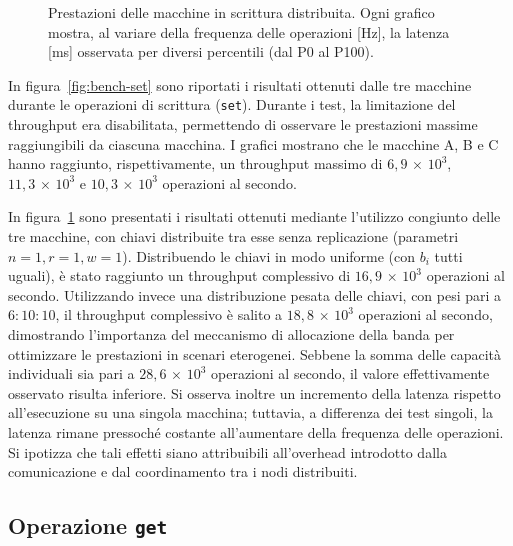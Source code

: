 \begin{figure}[htbp]
    \caption{Prestazioni delle macchine in scrittura distribuita. Ogni grafico mostra, al variare della frequenza delle operazioni [Hz], la latenza [ms] osservata per diversi percentili (dal P0 al P100).}
    \label{fig:bench-set-all}
\end{figure}

In figura~\ref{fig:bench-set} sono riportati i risultati ottenuti dalle tre macchine durante le operazioni di scrittura (\texttt{set}).
Durante i test, la limitazione del throughput era disabilitata, permettendo di osservare le prestazioni massime raggiungibili da ciascuna macchina.
I grafici mostrano che le macchine A, B e C hanno raggiunto, rispettivamente, un throughput massimo di $6{,}9\,{\times}\,10^3$, $11{,}3\,{\times}\,10^3$ e $10{,}3\,{\times}\,10^3$ operazioni al secondo.

In figura~\ref{fig:bench-set-all} sono presentati i risultati ottenuti mediante l'utilizzo congiunto delle tre macchine, con chiavi distribuite tra esse senza replicazione (parametri $n=1, r=1, w=1$).
Distribuendo le chiavi in modo uniforme (con $b_i$ tutti uguali), è stato raggiunto un throughput complessivo di $16{,}9\,{\times}\,10^3$ operazioni al secondo.
Utilizzando invece una distribuzione pesata delle chiavi, con pesi pari a $6{:}10{:}10$, il throughput complessivo è salito a $18{,}8\,{\times}\,10^3$ operazioni al secondo, dimostrando l'importanza del meccanismo di allocazione della banda per ottimizzare le prestazioni in scenari eterogenei.
Sebbene la somma delle capacità individuali sia pari a $28{,}6\,{\times}\,10^3$ operazioni al secondo, il valore effettivamente osservato risulta inferiore.
Si osserva inoltre un incremento della latenza rispetto all'esecuzione su una singola macchina; tuttavia, a differenza dei test singoli, la latenza rimane pressoché costante all'aumentare della frequenza delle operazioni.
Si ipotizza che tali effetti siano attribuibili all'overhead introdotto dalla comunicazione e dal coordinamento tra i nodi distribuiti.

\subsection{Operazione \texttt{get}}
\label{subsec:risultati-get}

